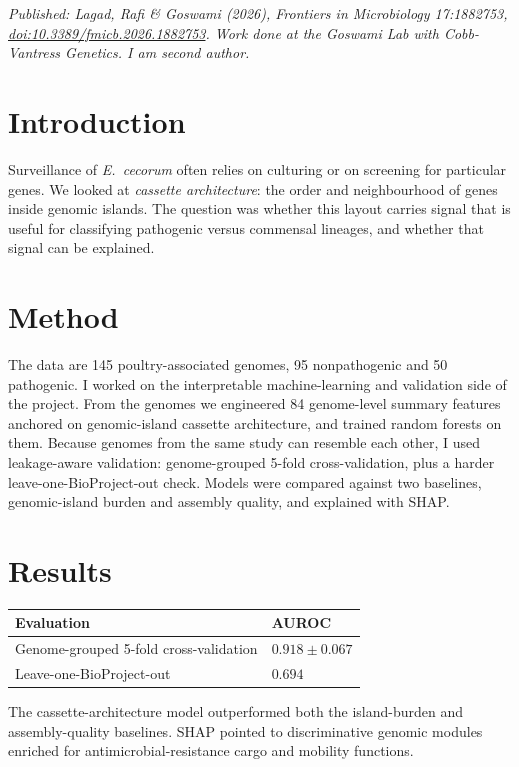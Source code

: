 

{\small\textit{Published: Lagad, Rafi \& Goswami (2026), \textit{Frontiers in Microbiology} 17:1882753, \href{https://doi.org/10.3389/fmicb.2026.1882753}{doi:10.3389/fmicb.2026.1882753}. Work done at the Goswami Lab with Cobb-Vantress Genetics. I am second author.}}


\section{Introduction}
Surveillance of \textit{E.\ cecorum} often relies on culturing or on screening for particular genes. We looked at \emph{cassette architecture}: the order and neighbourhood of genes inside genomic islands. The question was whether this layout carries signal that is useful for classifying pathogenic versus commensal lineages, and whether that signal can be explained.

\section{Method}
The data are 145 poultry-associated genomes, 95 nonpathogenic and 50 pathogenic. I worked on the interpretable machine-learning and validation side of the project. From the genomes we engineered 84 genome-level summary features anchored on genomic-island cassette architecture, and trained random forests on them. Because genomes from the same study can resemble each other, I used leakage-aware validation: genome-grouped 5-fold cross-validation, plus a harder leave-one-BioProject-out check. Models were compared against two baselines, genomic-island burden and assembly quality, and explained with SHAP.

\section{Results}
\begin{center}
\small
\begin{tabular}{@{}p{7.2cm}p{4.6cm}@{}}
\toprule
\textbf{Evaluation} & \textbf{AUROC}\\
\midrule
Genome-grouped 5-fold cross-validation & $0.918 \pm 0.067$\\
Leave-one-BioProject-out & $0.694$\\
\bottomrule
\end{tabular}
\end{center}
The cassette-architecture model outperformed both the island-burden and assembly-quality baselines. SHAP pointed to discriminative genomic modules enriched for antimicrobial-resistance cargo and mobility functions.

